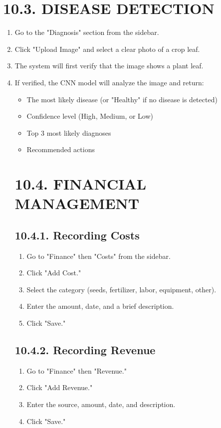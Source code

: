 \documentclass[12pt, a4paper]{report}
\begin{document}
\section{10.3. DISEASE DETECTION}
\begin{enumerate}[leftmargin=*]
  \item Go to the "Diagnosis" section from the sidebar.
  \item Click "Upload Image" and select a clear photo of a crop leaf.
  \item The system will first verify that the image shows a plant leaf.
  \item If verified, the CNN model will analyze the image and return:
\begin{itemize}[leftmargin=*]
  \item The most likely disease (or "Healthy" if no disease is detected)
  \item Confidence level (High, Medium, or Low)
  \item Top 3 most likely diagnoses
  \item Recommended actions
\end{itemize}
\section{10.4. FINANCIAL MANAGEMENT}
\subsection{10.4.1. Recording Costs}
\begin{enumerate}[leftmargin=*]
  \item Go to "Finance" then "Costs" from the sidebar.
  \item Click "Add Cost."
  \item Select the category (seeds, fertilizer, labor, equipment, other).
  \item Enter the amount, date, and a brief description.
  \item Click "Save."
\end{enumerate}
\subsection{10.4.2. Recording Revenue}
\begin{enumerate}[leftmargin=*]
  \item Go to "Finance" then "Revenue."
  \item Click "Add Revenue."
  \item Enter the source, amount, date, and description.
  \item Click "Save."
\end{enumerate}

\end{enumerate}
\end{document}
